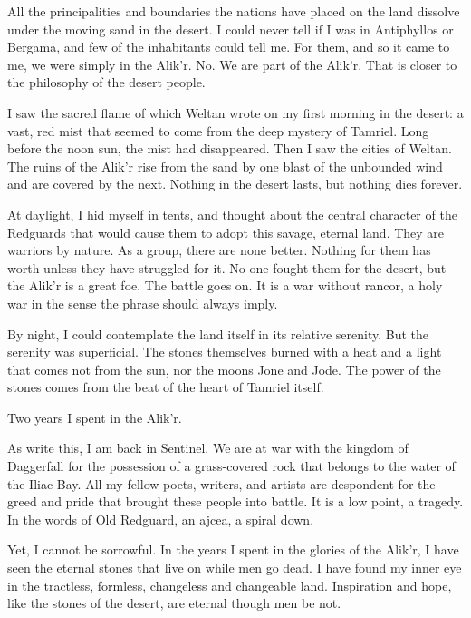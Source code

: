 All the principalities and boundaries the nations have placed on the land dissolve under the moving sand in the desert. I could never tell if I was in Antiphyllos or Bergama, and few of the inhabitants could tell me. For them, and so it came to me, we were simply in the Alik'r. No. We are part of the Alik'r. That is closer to the philosophy of the desert people.

I saw the sacred flame of which Weltan wrote on my first morning in the desert: a vast, red mist that seemed to come from the deep mystery of Tamriel. Long before the noon sun, the mist had disappeared. Then I saw the cities of Weltan. The ruins of the Alik'r rise from the sand by one blast of the unbounded wind and are covered by the next. Nothing in the desert lasts, but nothing dies forever.

At daylight, I hid myself in tents, and thought about the central character of the Redguards that would cause them to adopt this savage, eternal land. They are warriors by nature. As a group, there are none better. Nothing for them has worth unless they have struggled for it. No one fought them for the desert, but the Alik'r is a great foe. The battle goes on. It is a war without rancor, a holy war in the sense the phrase should always imply.

By night, I could contemplate the land itself in its relative serenity. But the serenity was superficial. The stones themselves burned with a heat and a light that comes not from the sun, nor the moons Jone and Jode. The power of the stones comes from the beat of the heart of Tamriel itself.

Two years I spent in the Alik'r.

As write this, I am back in Sentinel. We are at war with the kingdom of Daggerfall for the possession of a grass-covered rock that belongs to the water of the Iliac Bay. All my fellow poets, writers, and artists are despondent for the greed and pride that brought these people into battle. It is a low point, a tragedy. In the words of Old Redguard, an ajcea, a spiral down.

Yet, I cannot be sorrowful. In the years I spent in the glories of the Alik'r, I have seen the eternal stones that live on while men go dead. I have found my inner eye in the tractless, formless, changeless and changeable land. Inspiration and hope, like the stones of the desert, are eternal though men be not.